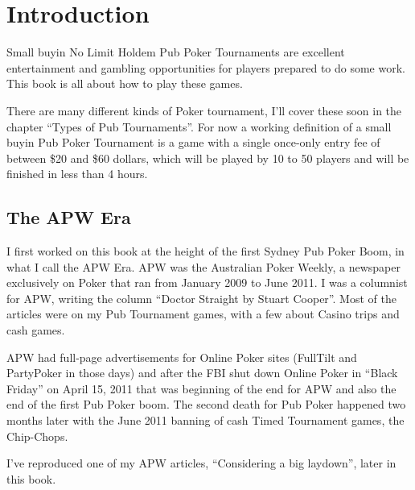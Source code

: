 \chapter{Introduction}


Small buyin No Limit Holdem Pub Poker Tournaments are excellent
entertainment and gambling opportunities for players prepared to do
some work. This book is all about how to play these games.

There are many different kinds of Poker tournament, I'll cover these
soon in the chapter ``Types of Pub Tournaments''. For now a
working definition of a small buyin
Pub Poker Tournament is a game with a single once-only entry fee of
between \$20 and \$60 dollars, which will be played by 10 to 50
players and will be finished in less than 4 hours.


\section{The APW Era}

I first worked on this book at the height of the first Sydney Pub
Poker Boom, in what I call the APW Era. APW was the Australian Poker
Weekly, a newspaper exclusively on Poker that ran from January 2009 to
June 2011. I was a columnist for APW, writing the column
``Doctor Straight by Stuart Cooper''. Most of the articles were on my
Pub Tournament games, with a few about Casino trips and cash games.

APW had full-page advertisements for Online Poker sites (FullTilt
and PartyPoker in those days) and after the FBI shut down Online Poker
in ``Black Friday'' on April 15, 2011 that was beginning of the end
for APW and also the end of the first Pub Poker boom. The second
death for Pub Poker happened two months later with the June 2011
banning of cash Timed Tournament games, the Chip-Chops.

I've reproduced one of my APW articles, ``Considering a big laydown'',
later in this book.

